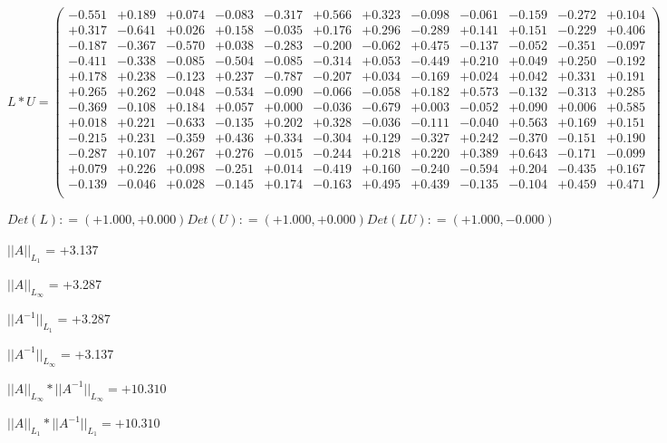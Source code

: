 \documentclass[9pt]{article}
\theoremstyle{plain}
\theoremstyle{definition}
\theoremstyle{remark}
\numberwithin{equation}{section}
\begin{document}
$L * U  = \left(
\begin{array}{
cccccccccccc}
-0.551 & +0.189 & +0.074 & -0.083 & -0.317 & +0.566 & +0.323 & -0.098 & -0.061 & -0.159 & -0.272 & +0.104 \\
+0.317 & -0.641 & +0.026 & +0.158 & -0.035 & +0.176 & +0.296 & -0.289 & +0.141 & +0.151 & -0.229 & +0.406 \\
-0.187 & -0.367 & -0.570 & +0.038 & -0.283 & -0.200 & -0.062 & +0.475 & -0.137 & -0.052 & -0.351 & -0.097 \\
-0.411 & -0.338 & -0.085 & -0.504 & -0.085 & -0.314 & +0.053 & -0.449 & +0.210 & +0.049 & +0.250 & -0.192 \\
+0.178 & +0.238 & -0.123 & +0.237 & -0.787 & -0.207 & +0.034 & -0.169 & +0.024 & +0.042 & +0.331 & +0.191 \\
+0.265 & +0.262 & -0.048 & -0.534 & -0.090 & -0.066 & -0.058 & +0.182 & +0.573 & -0.132 & -0.313 & +0.285 \\
-0.369 & -0.108 & +0.184 & +0.057 & +0.000 & -0.036 & -0.679 & +0.003 & -0.052 & +0.090 & +0.006 & +0.585 \\
+0.018 & +0.221 & -0.633 & -0.135 & +0.202 & +0.328 & -0.036 & -0.111 & -0.040 & +0.563 & +0.169 & +0.151 \\
-0.215 & +0.231 & -0.359 & +0.436 & +0.334 & -0.304 & +0.129 & -0.327 & +0.242 & -0.370 & -0.151 & +0.190 \\
-0.287 & +0.107 & +0.267 & +0.276 & -0.015 & -0.244 & +0.218 & +0.220 & +0.389 & +0.643 & -0.171 & -0.099 \\
+0.079 & +0.226 & +0.098 & -0.251 & +0.014 & -0.419 & +0.160 & -0.240 & -0.594 & +0.204 & -0.435 & +0.167 \\
-0.139 & -0.046 & +0.028 & -0.145 & +0.174 & -0.163 & +0.495 & +0.439 & -0.135 & -0.104 & +0.459 & +0.471 \\
\end{array}
\right)$ \newline 

$Det(L) :    = (+1.000,+0.000)     Det(U) :    = (+1.000,+0.000)     Det(LU) :    = (+1.000,-0.000)$

$||A||_{L_1}$  = +3.137

$||A||_{L_{\infty}}$ = +3.287

$||A^{-1}||_{L_1}$  = +3.287

$||A^{-1}||_{L_{\infty}}$ = +3.137

$||A||_{L_{\infty}} * ||A^{-1}||_{L_{\infty}} = +10.310$

$||A||_{L_1} * ||A^{-1}||_{L_1} = +10.310$
\end{document}
